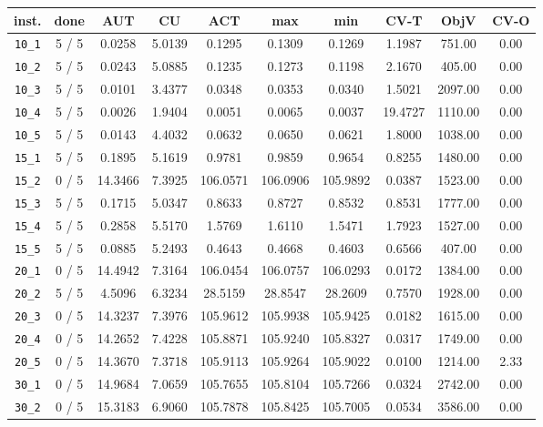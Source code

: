 \begin{table}[h!]
\begin{center}
\small
\begin{tabular}{| c | c | c | c | c | c | c | c | c | c |}
\hline
inst. & done & AUT & CU & ACT & max & min & CV-T & ObjV & CV-O \\
\hline
\verb|10_1| & 5 / 5 & 0.0258 & 5.0139 & 0.1295 & 0.1309 & 0.1269 & 1.1987 & 751.00 & 0.00\\ 
\verb|10_2| & 5 / 5 & 0.0243 & 5.0885 & 0.1235 & 0.1273 & 0.1198 & 2.1670 & 405.00 & 0.00\\ 
\verb|10_3| & 5 / 5 & 0.0101 & 3.4377 & 0.0348 & 0.0353 & 0.0340 & 1.5021 & 2097.00 & 0.00\\ 
\verb|10_4| & 5 / 5 & 0.0026 & 1.9404 & 0.0051 & 0.0065 & 0.0037 & 19.4727 & 1110.00 & 0.00\\ 
\verb|10_5| & 5 / 5 & 0.0143 & 4.4032 & 0.0632 & 0.0650 & 0.0621 & 1.8000 & 1038.00 & 0.00\\ 
\verb|15_1| & 5 / 5 & 0.1895 & 5.1619 & 0.9781 & 0.9859 & 0.9654 & 0.8255 & 1480.00 & 0.00\\ 
\verb|15_2| & 0 / 5 & 14.3466 & 7.3925 & 106.0571 & 106.0906 & 105.9892 & 0.0387 & 1523.00 & 0.00\\ 
\verb|15_3| & 5 / 5 & 0.1715 & 5.0347 & 0.8633 & 0.8727 & 0.8532 & 0.8531 & 1777.00 & 0.00\\ 
\verb|15_4| & 5 / 5 & 0.2858 & 5.5170 & 1.5769 & 1.6110 & 1.5471 & 1.7923 & 1527.00 & 0.00\\ 
\verb|15_5| & 5 / 5 & 0.0885 & 5.2493 & 0.4643 & 0.4668 & 0.4603 & 0.6566 & 407.00 & 0.00\\ 
\verb|20_1| & 0 / 5 & 14.4942 & 7.3164 & 106.0454 & 106.0757 & 106.0293 & 0.0172 & 1384.00 & 0.00\\ 
\verb|20_2| & 5 / 5 & 4.5096 & 6.3234 & 28.5159 & 28.8547 & 28.2609 & 0.7570 & 1928.00 & 0.00\\ 
\verb|20_3| & 0 / 5 & 14.3237 & 7.3976 & 105.9612 & 105.9938 & 105.9425 & 0.0182 & 1615.00 & 0.00\\ 
\verb|20_4| & 0 / 5 & 14.2652 & 7.4228 & 105.8871 & 105.9240 & 105.8327 & 0.0317 & 1749.00 & 0.00\\ 
\verb|20_5| & 0 / 5 & 14.3670 & 7.3718 & 105.9113 & 105.9264 & 105.9022 & 0.0100 & 1214.00 & 2.33\\ 
\verb|30_1| & 0 / 5 & 14.9684 & 7.0659 & 105.7655 & 105.8104 & 105.7266 & 0.0324 & 2742.00 & 0.00\\ 
\verb|30_2| & 0 / 5 & 15.3183 & 6.9060 & 105.7878 & 105.8425 & 105.7005 & 0.0534 & 3586.00 & 0.00\\ 

\end{tabular}
\end{center}
\end{table}

